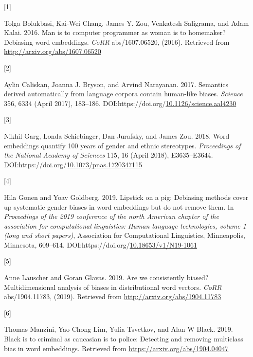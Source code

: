\documentclass[
  10pt,
  dvipsnames,enabledeprecatedfontcommands]{scrartcl}
\newlength{\cslhangindent}
\newlength{\csllabelwidth}
\newlength{\cslentryspacingunit} %
\newenvironment{CSLReferences}[2] %
 {%
  \setlength{\parindent}{0pt}
  \ifodd #1
  \let\oldpar\par
  \def\par{\hangindent=\cslhangindent\oldpar}
  \fi
  \setlength{\parskip}{#2\cslentryspacingunit}
 }%
 {}
\newcommand{\CSLLeftMargin}[1]{\parbox[t]{\csllabelwidth}{#1}}
\newcommand{\CSLRightInline}[1]{\parbox[t]{\linewidth - \csllabelwidth}{#1}\break}
\begin{document}
\hypertarget{refs}{}
\begin{CSLReferences}{0}{0}
\leavevmode{}%
\CSLLeftMargin{{[}1{]} }
\CSLRightInline{Tolga Bolukbasi, Kai-Wei Chang, James Y. Zou, Venkatesh
Saligrama, and Adam Kalai. 2016. Man is to computer programmer as woman
is to homemaker? Debiasing word embeddings. \emph{CoRR} abs/1607.06520,
(2016). Retrieved from \url{http://arxiv.org/abs/1607.06520}}

\leavevmode{}%
\CSLLeftMargin{{[}2{]} }
\CSLRightInline{Aylin Caliskan, Joanna J. Bryson, and Arvind Narayanan.
2017. Semantics derived automatically from language corpora contain
human-like biases. \emph{Science} 356, 6334 (April 2017), 183--186.
DOI:https://doi.org/\href{https://doi.org/10.1126/science.aal4230}{10.1126/science.aal4230}}

\leavevmode{}%
\CSLLeftMargin{{[}3{]} }
\CSLRightInline{Nikhil Garg, Londa Schiebinger, Dan Jurafsky, and James
Zou. 2018. Word embeddings quantify 100 years of gender and ethnic
stereotypes. \emph{Proceedings of the National Academy of Sciences} 115,
16 (April 2018), E3635--E3644.
DOI:https://doi.org/\href{https://doi.org/10.1073/pnas.1720347115}{10.1073/pnas.1720347115}}

\leavevmode{}%
\CSLLeftMargin{{[}4{]} }
\CSLRightInline{Hila Gonen and Yoav Goldberg. 2019. Lipstick on a pig:
{D}ebiasing methods cover up systematic gender biases in word embeddings
but do not remove them. In \emph{Proceedings of the 2019 conference of
the north {A}merican chapter of the association for computational
linguistics: Human language technologies, volume 1 (long and short
papers)}, Association for Computational Linguistics, Minneapolis,
Minnesota, 609--614.
DOI:https://doi.org/\href{https://doi.org/10.18653/v1/N19-1061}{10.18653/v1/N19-1061}}

\leavevmode{}%
\CSLLeftMargin{{[}5{]} }
\CSLRightInline{Anne Lauscher and Goran Glavas. 2019. Are we
consistently biased? Multidimensional analysis of biases in
distributional word vectors. \emph{CoRR} abs/1904.11783, (2019).
Retrieved from \url{http://arxiv.org/abs/1904.11783}}

\leavevmode{}%
\CSLLeftMargin{{[}6{]} }
\CSLRightInline{Thomas Manzini, Yao Chong Lim, Yulia Tsvetkov, and Alan
W Black. 2019. Black is to criminal as caucasian is to police: Detecting
and removing multiclass bias in word embeddings. Retrieved from
\url{https://arxiv.org/abs/1904.04047}}


\end{CSLReferences}
\end{document}
